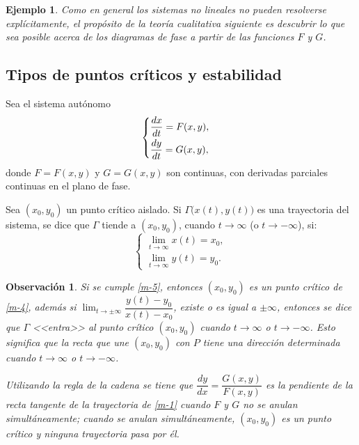 \documentclass[a5paper,doc,10pt,noapacite]{apa6}
\newtheorem{observ}{Observación}
\newtheorem{ejem}{Ejemplo}
\begin{document}
{{\begin{ejem}
	\vspace{0.75\baselineskip}
	Como en general los sistemas no lineales no pueden resolverse explícitamente, el propósito de la teoría cualitativa siguiente es descubrir lo que sea posible acerca de los diagramas de fase a partir de las funciones \(F\) y \(G\).
\end{ejem}


%
%
%
\subsection{Tipos de puntos críticos y estabilidad}
%
%
%
Sea el sistema autónomo
\begin{equation}\label{m-4}
	\begin{cases}
		\dfrac{dx}{dt}=F(x,y) ,\vspace{0.3em}
		\\
		\dfrac{dy}{dt}=G(x,y),
	\end{cases}
\end{equation}
donde \(F=F(x,y)\) y \(G=G(x,y)\) son continuas, con derivadas parciales continuas en el plano de fase.

Sea \((x_0,y_0)\) un punto crítico aislado. Si \(\Gamma\big(x(t),y(t)\big)\) es una trayectoria del sistema, se dice que \(\Gamma\) tiende a \((x_0,y_0)\), cuando \(t\to\infty\) (o \(t\to-\infty\)), si:
\begin{equation}\label{m-5}
	\begin{cases}
		\lim_{t\to \infty} x(t) = x_0,
			 \\
		\lim_{t\to \infty} y(t) = y_0.
	\end{cases}
\end{equation}

\begin{observ}
	Si se cumple \eqref{m-5}, entonces \((x_0,y_0)\) es un punto crítico de \eqref{m-4}, además si \(\lim_{t\to\pm\infty}\dfrac{ y(t)-y_0}{x(t)-x_0}\), existe o es igual  a \(\pm\infty\), entonces se dice que \(\Gamma\) <<entra>> al punto crítico \((x_0,y_0)\) cuando \(t\to\infty\) o \(t\to-\infty\). Esto significa que la recta que une \((x_0,y_0)\) con \(P\) tiene una dirección determinada cuando \(t\to\infty\) o \(t\to-\infty\).
	
	Utilizando la regla de la cadena se tiene que \(\dfrac{dy}{dx}=\dfrac{G(x,y)}{F(x,y)}\) es la pendiente de la recta tangente de la trayectoria de \eqref{m-1} cuando \(F\) y \(G\) no se anulan simultáneamente; cuando se anulan simultáneamente, \((x_0,y_0)\) es un punto crítico y ninguna trayectoria pasa por él.
\end{observ}


}}
\end{document}

